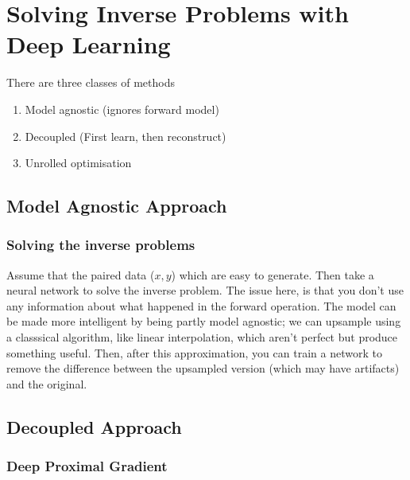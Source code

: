 \documentclass[11pt]{article}
\begin{document}
\section{Solving Inverse Problems with Deep Learning}

There are three classes of methods

\begin{enumerate}
    \item Model agnostic (ignores forward model)
    \item Decoupled (First learn, then reconstruct)
    \item Unrolled optimisation
\end{enumerate}

\subsection{Model Agnostic Approach}

\subsubsection{Solving the inverse problems}

\begin{figure}[H]
    \centering
\end{figure}    

Assume that the paired data ($x,y$) which are easy to generate. Then take a neural network to solve the inverse problem. The issue here, is that you don't use any information about what happened in the forward operation. The model can be made more intelligent by being partly model agnostic; we can upsample using a classsical algorithm, like linear interpolation, which aren't perfect but produce something useful. Then, after this approximation, you can train a network to remove the difference between the upsampled version (which may have artifacts) and the original.

\subsection{Decoupled Approach}

\subsubsection{Deep Proximal Gradient}
\end{document}
